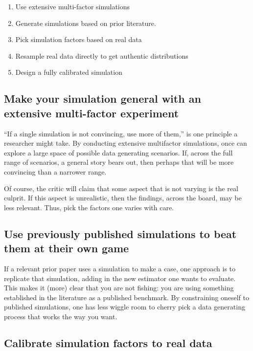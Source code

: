 \documentclass[
]{book}
\providecommand{\tightlist}{%
  \setlength{\itemsep}{0pt}\setlength{\parskip}{0pt}}
\begin{document}
\begin{enumerate}
\def\labelenumi{\arabic{enumi}.}
\tightlist
\item
  Use extensive multi-factor simulations
\item
  Generate simulations based on prior literature.
\item
  Pick simulation factors based on real data
\item
  Resample real data directly to get authentic distributions
\item
  Design a fully calibrated simulation
\end{enumerate}

\subsection{Make your simulation general with an extensive multi-factor experiment}\label{make-your-simulation-general-with-an-extensive-multi-factor-experiment}

``If a single simulation is not convincing, use more of them,'' is one principle a researcher might take.
By conducting extensive multifactor simulations, once can explore a large space of possible data generating scenarios.
If, across the full range of scenarios, a general story bears out, then perhaps that will be more convincing than a narrower range.

Of course, the critic will claim that some aspect that is not varying is the real culprit.
If this aspect is unrealistic, then the findings, across the board, may be less relevant.
Thus, pick the factors one varies with care.

\subsection{Use previously published simulations to beat them at their own game}\label{use-previously-published-simulations-to-beat-them-at-their-own-game}

If a relevant prior paper uses a simulation to make a case, one approach is to replicate that simulation, adding in the new estimator one wants to evaluate.
This makes it (more) clear that you are not fishing: you are using something established in the literature as a published benchmark.
By constraining oneself to published simulations, one has less wiggle room to cherry pick a data generating process that works the way you want.

\subsection{Calibrate simulation factors to real data}\label{calibrate-simulation-factors-to-real-data}
\end{document}
